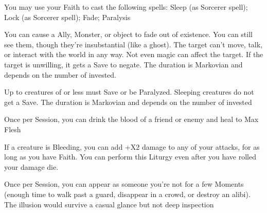 {

You may use your Faith to cast the following spells: Sleep (as Sorcerer spell); Lock (as Sorcerer spell); Fade; Paralysis

\LITURGY [
  Name= Fade,
  Link= nyx-liturgy-fade,
  Paradigm= Mind ,
  Save=  Y (negates) ,
  Duration= Markovian ,
  Counter=  n/a  ,
  Keywords= None ,
  Target=   Nearby creature or object
]



You can cause a Ally, Monster, or object to fade out of existence.  You can still see them, though they're insubstantial (like a ghost).  The target can't move, talk, or interact with the world in any way.  Not even magic can affect the target.  If the target is unwilling, it gets a Save to negate.  The duration is Markovian and depends on the number of \DICE invested.

\LITURGY [
  Name= Paralysis,
  Link=nyx-liturgy-paralysis,
  Paradigm= Mind ,
  Save=  Y (negates) ,
  Duration= Markovian ,
  Counter=  n/a  ,
  Keywords= Splittable ,
  Target=   Close or Nearby Creature
]



Up to \DICE creatures of \DICE \HD or less must Save or be Paralyzed.  Sleeping creatures do not get a Save. The duration is Markovian and depends on the number of \DICE invested



\GOD[
Name=Shezmu,
Link=small-god-shezmu,
GodOf=Prince of Blood,
Holy=a vial of blood other than your own (preferably the blood of the one who indoctrinated you into the faith)
]


Once per Session, you can drink the blood of a friend or enemy and heal to Max Flesh


If a creature is Bleeding, you can add +\DICE X2 damage to any of your attacks, for as long as you have Faith.  You can perform this Liturgy even after you have rolled your damage die.




\GOD[
Name=The King in Yellow,
Link=small-god-the king in yellow,
GodOf=Fiend of Illusion and Disguises,
Holy=a yellow cowl and mask
]


Once per Session, you can appear as someone you're not for a few Moments (enough time to walk past a guard, disappear in a crowd, or destroy an alibi).  The illusion would survive a casual glance but not deep inspection

}
